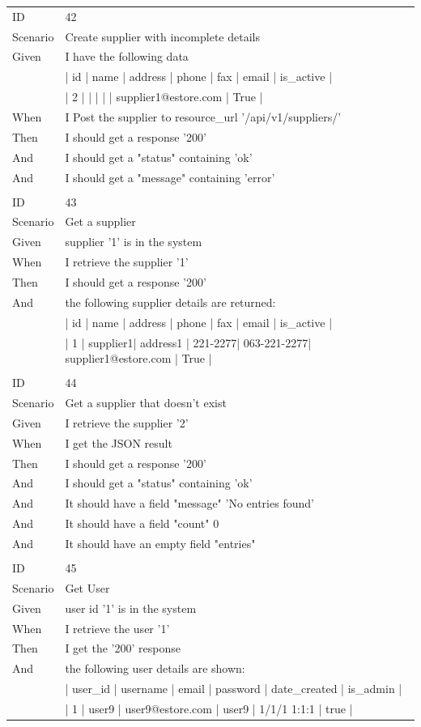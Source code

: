 \documentclass{report}
\begin{document}
\begin{tabular}{ l l }
ID 			& 42\\
Scenario		& Create supplier with incomplete details \\
Given 		& I have the following data \\
       		& | id | name | address  | phone   | fax         | email                | is\_active | \\
       		& |  2 | | | | | supplier1@estore.com | True      | \\
When 		& I Post the supplier to resource\_url  '/api/v1/suppliers/'\\
Then 		& I should get a response '200' \\
And 			& I should get a "status" containing 'ok' \\
And 			& I should get a "message" containing 'error' \\ \\
ID 			& 43\\
Scenario		& Get a supplier \\
Given 		& supplier '1' is in the system \\
When 		& I retrieve the supplier '1' \\
Then 		& I should get a response '200' \\
And 			& the following supplier details are returned: \\
    			& | id | name     | address  | phone   | fax         | email                | is\_active | \\
    			& | 1  | supplier1| address1 | 221-2277| 063-221-2277| supplier1@estore.com | True      | \\ \\
ID 			& 44\\
Scenario		& Get a supplier that doesn't exist \\
Given 		& I retrieve the supplier '2' \\
When 		& I get the JSON result \\
Then 		& I should get a response '200' \\
And 			& I should get a "status" containing 'ok' \\
And 			& It should have a field "message" 'No entries found' \\
And 			& It should have a field "count" 0 \\
And 			& It should have an empty field "entries" \\ \\
ID 			& 45\\
Scenario		& Get User \\
Given 		& user id '1' is in the system \\
When 		& I retrieve the user '1' \\
Then 		& I get the '200' response \\
And			& the following user details are shown: \\
      		& | user\_id | username | email            | password | date\_created | is\_admin | \\
      		& | 1       | user9    | user9@estore.com | user9    | 1/1/1 1:1:1  | true     | 
\end{tabular}
\newpage
\end{document}
